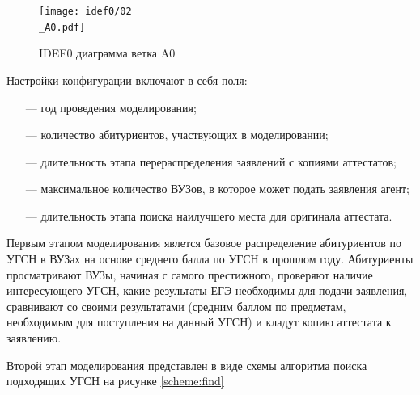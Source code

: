 \begin{figure}[hbtp]
	\centering
	\texttt{[image: idef0/02\\\_A0.pdf]}
	\caption{IDEF0 диаграмма ветка A0}
	\label{A0}
\end{figure}

Настройки конфигурации включают в себя поля:

\begin{itemize}[leftmargin=1.6\parindent]
	\item[---] год проведения моделирования;
	\item[---] количество абитуриентов, участвующих в моделировании;
	\item[---] длительность этапа перераспределения заявлений с копиями аттестатов;
	\item[---] максимальное количество ВУЗов, в которое может подать заявления агент;
	\item[---] длительность этапа поиска наилучшего места для оригинала аттестата.

\end{itemize}

Первым этапом моделирования явлется базовое распределение абитуриентов по УГСН в ВУЗах на основе среднего балла по УГСН в прошлом году. Абитуриенты просматривают ВУЗы, начиная с самого престижного, проверяют наличие интересующего УГСН, какие результаты ЕГЭ необходимы для подачи заявления, сравнивают со своими результатами (средним баллом по предметам, необходимым для поступления на данный УГСН) и кладут копию аттестата к заявлению.

Второй этап моделирования представлен в виде схемы алгоритма поиска подходящих УГСН на рисунке \ref{scheme:find}

